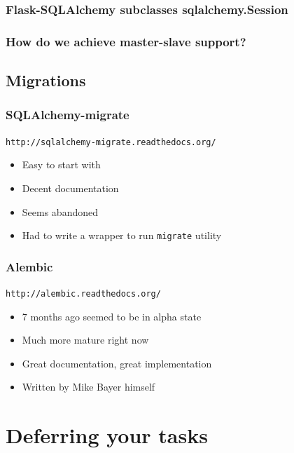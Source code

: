 \documentclass{beamer}
\begin{document}
\begin{frame}
  \frametitle{Flask-SQLAlchemy subclasses sqlalchemy.Session}
  
\end{frame}

\begin{frame}
  \frametitle{How do we achieve master-slave support?}
\end{frame}

\subsection{Migrations}

\begin{frame}
  \frametitle{SQLAlchemy-migrate}
  \texttt{http://sqlalchemy-migrate.readthedocs.org/}
  \begin{itemize}
  \item Easy to start with
  \item Decent documentation
  \item Seems abandoned
  \item Had to write a wrapper to run \texttt{migrate} utility
  \end{itemize}
\end{frame}

\begin{frame}
  \frametitle{Alembic}
  \texttt{http://alembic.readthedocs.org/}
  \begin{itemize}
  \item 7 months ago seemed to be in alpha state
  \item Much more mature right now
  \item Great documentation, great implementation
  \item Written by Mike Bayer himself
  \end{itemize}
\end{frame}

\section{Deferring your tasks}
\end{document}
